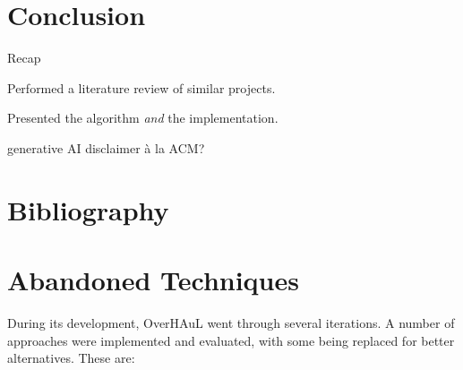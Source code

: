 \documentclass[
  a4paper,
]{scrreprt}
\theoremstyle{definition}
\theoremstyle{remark}
\begin{document}

\chapter{Conclusion}\label{conclusion}

Recap

Performed a literature review of similar projects.

Presented the algorithm \emph{and} the implementation.

generative AI disclaimer à la ACM?


\chapter*{Bibliography}\label{bibliography}


\printbibliography[heading=none]

\cleardoublepage
{}
{}
\appendix

\chapter{Abandoned Techniques}\label{sec-abandoned}

During its development, OverHAuL went through several iterations. A
number of approaches were implemented and evaluated, with some being
replaced for better alternatives. These are:
\end{document}
